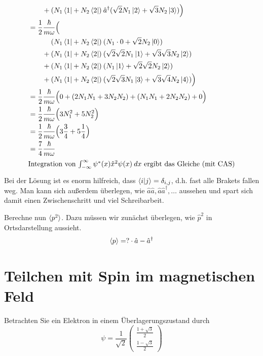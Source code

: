 \documentclass{scrartcl}
\begin{document}
\begin{enumerate}[a)]
\begin{align*}
				&\qquad		    + (N_1 \bra 1 + N_2 \bra 2)\:\hat a^\dagger(\sqrt 2 N_1\ket 2 + \sqrt 3 N_2\ket 3) \Big)\\
				&=  \frac 12 \frac{\hbar}{m\omega} \Big(	\\
				&\qquad\phantom +\:\: (N_1 \bra 1 + N_2 \bra 2)\:(N_1\cdot 0  + \sqrt 2 N_2\ket 0) \\
				&\qquad		    + (N_1 \bra 1 + N_2 \bra 2)\:(\sqrt 2 \sqrt 2 N_1\ket 1 + \sqrt 3 \sqrt 3 N_2\ket 2) \\
				&\qquad		    + (N_1 \bra 1 + N_2 \bra 2)\:(N_1\ket 1 +\sqrt 2 \sqrt 2  N_2\ket 2) \\
				&\qquad		    + (N_1 \bra 1 + N_2 \bra 2)\:(\sqrt 2 \sqrt 3 N_1\ket 3 + \sqrt 3 \sqrt 4 N_2\ket 4) \Big) \\
				&=  \frac 12 \frac{\hbar}{m\omega} \Big( 0 + (2 N_1 N_1 + 3 N_2 N_2)  + (N_1 N_1 + 2 N_2 N_2) + 0\Big) \\
				&=  \frac 12 \frac{\hbar}{m\omega} \Big( 3 N_1^2 + 5 N_2^2\Big) \\
				&=  \frac 12 \frac{\hbar}{m\omega} \Big( 3 \frac 34 + 5 \frac 14 \Big) \\
				&=  \frac 74 \frac{\hbar}{m\omega}\\
\intertext{Integration von $\int_{-\infty}^{\infty} \psi^\ast(x) \hat x^2 \psi(x)\:dx$ ergibt das Gleiche (mit CAS)}
\end{align*}
Bei der Lösung ist es enorm hilfreich, dass $\braket{i|j} = \delta_{i,j}$, d.h. fast alle Brakets fallen weg. Man kann sich außerdem überlegen, wie $\hat a \hat a, \hat a\hat a^\dagger, \dots$ aussehen und spart sich damit einen Zwischenschritt und viel Schreibarbeit.

Berechne nun $\braket{p^2}$. Dazu müssen wir zunächst überlegen, wie $\hat p^2$ in Ortsdarstellung aussieht.
\begin{align*}
\braket{p}	&= ? \cdot \hat a - \hat a^\dagger\\	%
\end{align*}


\end{enumerate}

\section{Teilchen mit Spin im magnetischen Feld}
Betrachten Sie ein Elektron in einem Überlagerungszustand durch
\[\psi=\frac{1}{\sqrt 2}\begin{pmatrix}\frac{1+\sqrt 3}{2}\\\frac{1-\sqrt 3}{2}\end{pmatrix}\]
\end{document}

